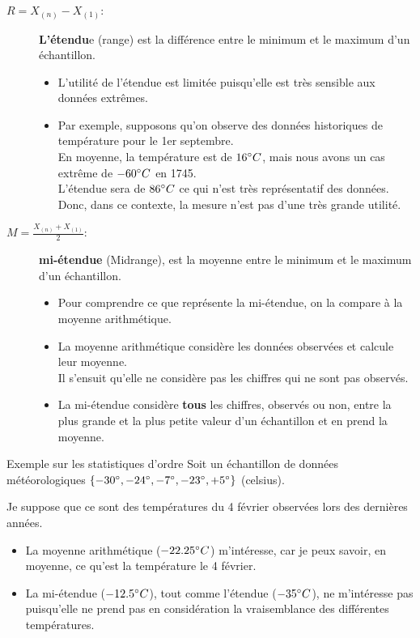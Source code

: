 \documentclass[10pt, french]{article}
\begin{document}
\begin{multicols*}{2}
\begin{description}
	\item[$R = X_{(n)} - X_{(1)}$: ] \textbf{L'étendu}e (range) est la différence entre le minimum et le maximum d'un échantillon.
		\begin{itemize}[leftmargin = *]
		\item	L'utilité de l'étendue est limitée puisqu'elle est très sensible aux données extrêmes.
		\item	Par exemple, supposons qu’on observe des données historiques de température pour le 1er septembre. \\
				En moyenne, la température est de $16\degree C$, mais nous avons un cas extrême de $-60\degree C$ en 1745.\\
				L'étendue sera de $86\degree C$ ce qui n'est très représentatif des données.\\
				Donc, dans ce contexte, la mesure n'est pas d'une très grande utilité.
		\end{itemize}
	\item[$M = \frac{X_{(n)} + X_{(1)}}{2}$: ] \textbf{mi-étendue} (Midrange), est la moyenne entre le minimum et le maximum d'un échantillon.
		\begin{itemize}[leftmargin = *]
		\item	Pour comprendre ce que représente la mi-étendue, on la compare à la moyenne arithmétique.
		\item	La moyenne arithmétique considère les données observées et calcule leur moyenne.\\
				Il s'ensuit qu'elle ne considère pas les chiffres qui ne sont pas observés.
		\item	La mi-étendue considère \textbf{tous} les chiffres, observés ou non, entre la plus grande et la plus petite valeur d'un échantillon et en prend la moyenne.		
		\end{itemize}
\end{description}

\begin{conceptgen}{Exemple sur les statistiques d'ordre}
Soit un échantillon de données météorologiques $\{-30\degree, -24\degree, -7\degree, -23\degree, +5\degree\}$ (celsius).

Je suppose que ce sont des températures du 4 février observées lors des dernières années.
\begin{itemize}[leftmargin = *]
	\item	La moyenne arithmétique ($-22.25\degree C$) m'intéresse, car je peux savoir, en moyenne, ce qu'est la température le 4 février.
	\item	La mi-étendue ($-12.5\degree C$), tout comme l'étendue ($-35\degree C$), ne m'intéresse pas puisqu'elle ne prend pas en considération la vraisemblance des différentes températures.
\end{itemize}


\end{conceptgen}
\end{multicols*}
\end{document}
